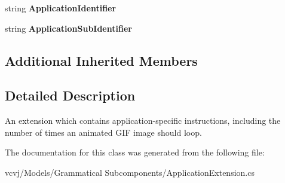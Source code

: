 \begin{DoxyCompactItemize}
\item 
string {\bfseries Application\+Identifier}\hypertarget{classvcvj_1_1_models_1_1_grammatical___subcomponents_1_1_application_extension_a505812e93536fa6ea2f2c94706bb784b}{}\label{classvcvj_1_1_models_1_1_grammatical___subcomponents_1_1_application_extension_a505812e93536fa6ea2f2c94706bb784b}

\item 
string {\bfseries Application\+Sub\+Identifier}\hypertarget{classvcvj_1_1_models_1_1_grammatical___subcomponents_1_1_application_extension_af1d299c56520f59f4b4c78201f9c21a6}{}\label{classvcvj_1_1_models_1_1_grammatical___subcomponents_1_1_application_extension_af1d299c56520f59f4b4c78201f9c21a6}

\end{DoxyCompactItemize}
\subsection*{Additional Inherited Members}


\subsection{Detailed Description}
An extension which contains application-\/specific instructions, including the number of times an animated G\+IF image should loop. 



The documentation for this class was generated from the following file\+:\begin{DoxyCompactItemize}
\item 
vcvj/\+Models/\+Grammatical Subcomponents/Application\+Extension.\+cs\end{DoxyCompactItemize}
